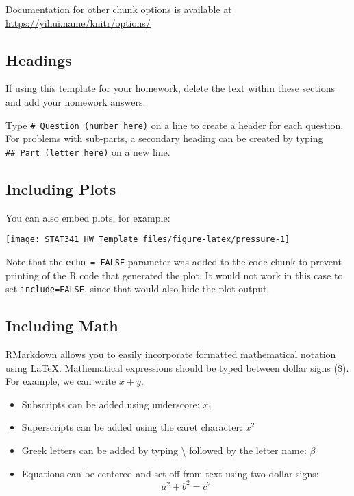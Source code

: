 \documentclass[]{article}
\providecommand{\tightlist}{%
  \setlength{\itemsep}{0pt}\setlength{\parskip}{0pt}}
\begin{document}
Documentation for other chunk options is available at
\url{https://yihui.name/knitr/options/}

\subsection{Headings}\label{headings}

If using this template for your homework, delete the text within these
sections and add your homework answers.

Type \texttt{\#\ Question\ (number\ here)} on a line to create a header
for each question. For problems with sub-parts, a secondary heading can
be created by typing \texttt{\#\#\ Part\ (letter\ here)} on a new line.

\subsection{Including Plots}\label{including-plots}

You can also embed plots, for example:

\texttt{[image: STAT341\_HW\_Template\_files/figure-latex/pressure-1]}

Note that the \texttt{echo\ =\ FALSE} parameter was added to the code
chunk to prevent printing of the R code that generated the plot. It
would not work in this case to set \texttt{include=FALSE}, since that
would also hide the plot output.

\subsection{Including Math}\label{including-math}

RMarkdown allows you to easily incorporate formatted mathematical
notation using LaTeX. Mathematical expressions should be typed between
dollar signs (\$). For example, we can write \(x + y\).

\begin{itemize}
\tightlist
\item
  Subscripts can be added using underscore: \(x_1\)
\item
  Superscripts can be added using the caret character: \(x^2\)
\item
  Greek letters can be added by typing \textbackslash{} followed by the
  letter name: \(\beta\)
\item
  Equations can be centered and set off from text using two dollar
  signs: \[a^2 + b^2 = c^2\]
\end{itemize}
\end{document}
